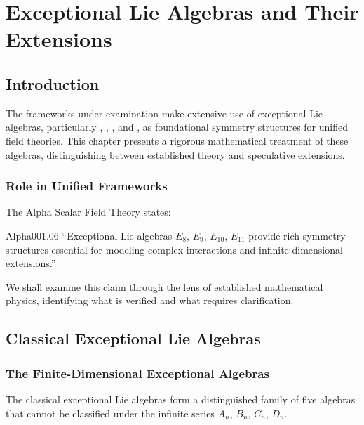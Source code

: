 
\chapter{Exceptional Lie Algebras and Their Extensions}
\label{ch:lie_algebras}

\section{Introduction}

The frameworks under examination make extensive use of exceptional Lie algebras, particularly , , , and , as foundational symmetry structures for unified field theories. This chapter presents a rigorous mathematical treatment of these algebras, distinguishing between established theory and speculative extensions.

\subsection{Role in Unified Frameworks}

The Alpha Scalar Field Theory states:

\begin{frameworkclaim}{Alpha001.06}
``Exceptional Lie algebras $E_8$, $E_9$, $E_{10}$, $E_{11}$ provide rich symmetry structures essential for modeling complex interactions and infinite-dimensional extensions.''
\end{frameworkclaim}

We shall examine this claim through the lens of established mathematical physics, identifying what is verified and what requires clarification.

\section{Classical Exceptional Lie Algebras}

\subsection{The Finite-Dimensional Exceptional Algebras}

The classical exceptional Lie algebras form a distinguished family of five algebras that cannot be classified under the infinite series $A_n$, $B_n$, $C_n$, $D_n$.

